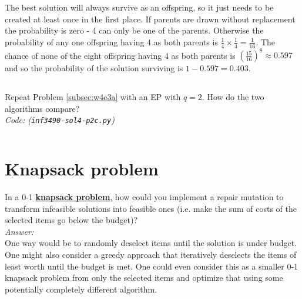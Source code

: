 The best solution will always survive as an offspring, so it just needs to be created
at least once in the first place. If parents are drawn without replacement the
probability is zero - 4 can only be one of the parents. Otherwise the probability of
any one offspring having 4 as both parents is
\( \frac{1}{4} \times \frac{1}{4} = \frac{1}{16} \).
The chance of none of the eight offspring having 4 as both parents is
\( (\frac{15}{16})^8 \approx 0.597 \)
and so the probability of the solution surviving is
\(1 - 0.597 = 0.403\).


\subsection{\marginsymbol} %
Repeat Problem \ref{subsec:w4e3a} with an EP with \(q = 2\).
How do the two algorithms compare?\\

\textit{Code: (\texttt{inf3490-sol4-p2c.py})}\\
\inputminted{Python}{inf3490-sol4-p2c.py}

\section{Knapsack problem}
In a 0-1 \href{https://en.wikipedia.org/wiki/Knapsack_problem}{\textbf{knapsack problem}},
how could you implement a repair mutation to transform infeasible solutions into feasible ones
(i.e. make the sum of costs of the selected items go below the budget)?\\

\textit{Answer:}\\

One way would be to randomly deselect items until the solution is under budget.
One might also consider a greedy approach that iteratively deselects the items of
least worth until the budget is met. One could even consider this as a smaller
0-1 knapsack problem from only the selected items and optimize that using some
potentially completely different algorithm.



